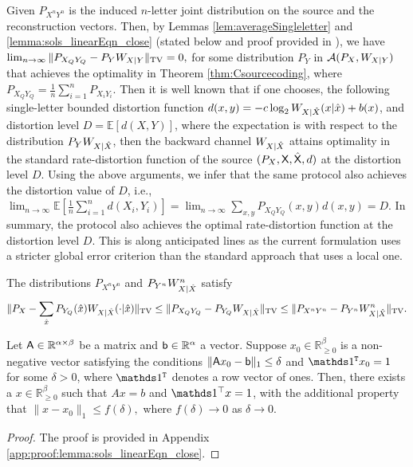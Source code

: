 Given 
$P_{X^nY^n}$ is the induced $n$-letter joint distribution on the source and the reconstruction vectors. 
Then, by Lemmas \ref{lem:averageSingleletter} and \ref{lemma:sols_linearEqn_close} (stated below and proof provided in \cite{sohail2025WZ}), we have
$\lim_{n \rightarrow \infty} \| P_{X_QY_Q} - P_{Y}W_{X|Y} \|_{\normalfont \text{TV}} =0,$
for some distribution $P_{Y}$  
in $\mathcal{A}({P}_X,W_{X|Y})$ that achieves the optimality in Theorem \ref{thm:Csourcecoding},
where $P_{X_QY_Q}=\tfrac{1}{n} \sum_{i=1}^n P_{X_iY_i}.$
Then it is well known \cite[Problem 8.3]{csiszar2011information} that if one chooses, the following single-letter bounded distortion function 
$d(x,y)= -c\log_2 {W}_{X|\hat{X}}(x|\hat{x})+b(x)$,
and distortion level $D={\mathbb{E}[d(X,Y)]}$, where the expectation is with respect to the distribution $P_{Y} {W}_{X|\hat{X}}$,
then the backward channel ${W}_{X|\hat{X}}$ attains optimality in the standard rate-distortion function of the source 
$({P}_X,\mathsf{X},\hat{\mathsf{X}},d)$
at the distortion level $D$.
Using the above arguments, we 
infer that the same protocol also achieves the 
distortion value of $D$, i.e., $\lim_{n \rightarrow \infty} \!\mathbb{E} [\tfrac{1}{n} \!\sum_{i=1}^n d(X_i,{Y_i})] \!=\!\lim_{n \rightarrow \infty} \sum_{x,y} \!P_{X_QY_Q}\!(x,y) d(x,y)\! =\!
D.$
In summary, the protocol also achieves the optimal rate-distortion function at the distortion level $D$. 
This is along anticipated lines as the current formulation uses a stricter global error criterion than the standard approach that uses a local one.

\begin{lemma} \cite[Lemma 8]{atif2023lossy}\label{lem:averageSingleletter}
The distributions $P_{X^nY^n}$ and $P_{Y^n}{W}_{X|\hat{X}}^n$ satisfy
$$ \|P_X - \sum_{\hat{x}} P_{Y_Q}(\hat{x}){W}_{X|\hat{X}}(\cdot|\hat{x}) \|_{\normalfont \text{TV}} \leq 
\|P_{X_QY_Q} - P_{Y_Q}{W}_{X|\hat{X}} \|_{\normalfont \text{TV}}  \leq 
\|P_{X^nY^n} -
    P_{Y^n}{W}_{X|\hat{X}}^n\|_{\normalfont \text{TV}}.$$
\end{lemma}
\begin{lemma} \label{lemma:sols_linearEqn_close}
Let \( \mathsf{A} \in \mathbb{R}^{\alpha \times \beta} \) be a matrix and \( \mathsf{b} \in \mathbb{R}^{\alpha} \) a vector. Suppose \( x_0 \in \mathbb{R}^{\beta}_{\geq 0} \) is a non-negative vector satisfying the conditions \( \|\mathsf{A} x_0 - \mathsf{b}\|_1 \leq \delta \) and \( \I^\texttt{T} x_0 = 1 \) for some \( \delta > 0 \), where \( \I^\texttt{T} \) denotes a row vector of ones.
Then, there exists a \( x \in \mathbb{R}^{\beta}_{\geq 0} \) such that \( A x = b \) and \( \I^\top x = 1 \), with the additional property that
$\|x - x_0\|_1 \leq f(\delta),$
where \( f(\delta) \to 0 \) as \( \delta \to 0 \).
\end{lemma}
\begin{proof}
    The proof is provided in Appendix \ref{app:proof:lemma:sols_linearEqn_close}.
\end{proof}